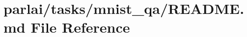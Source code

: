 \hypertarget{parlai_2tasks_2mnist__qa_2README_8md}{}\section{parlai/tasks/mnist\+\_\+qa/\+R\+E\+A\+D\+ME.md File Reference}
\label{parlai_2tasks_2mnist__qa_2README_8md}
